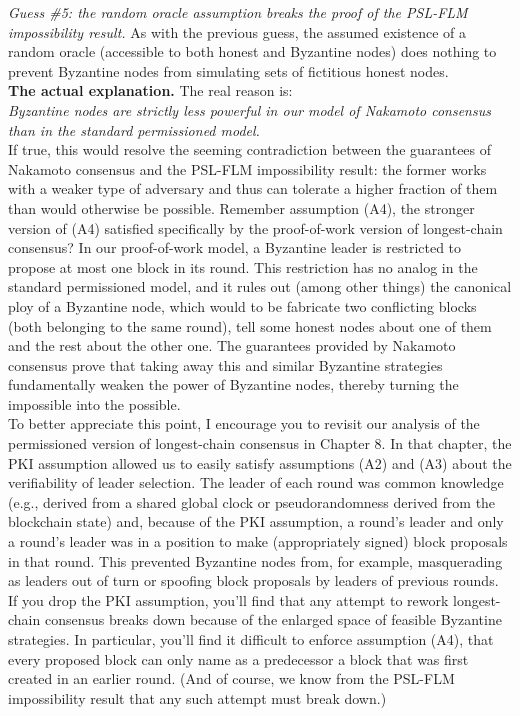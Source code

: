 \textit{Guess \#5: the random oracle assumption breaks the proof of the PSL-FLM impossibility
result.}
As with the previous guess, the assumed existence of a random oracle (accessible to both
honest and Byzantine nodes) does nothing to prevent Byzantine nodes from simulating sets
of fictitious honest nodes.\\

\noindent
\textbf{The actual explanation.} The real reason is:\\
\textit{Byzantine nodes are strictly less powerful in our model of Nakamoto consensus than in
the standard permissioned model.}\\

If true, this would resolve the seeming contradiction between the guarantees of Nakamoto
consensus and the PSL-FLM impossibility result: the former works with a weaker type of
adversary and thus can tolerate a higher fraction of them than would otherwise be possible.
Remember assumption (A4), the stronger version of (A4) satisfied specifically by the
proof-of-work version of longest-chain consensus? In our proof-of-work model, a Byzantine
leader is restricted to propose at most one block in its round. This restriction has no analog
in the standard permissioned model, and it rules out (among other things) the canonical ploy
of a Byzantine node, which would to be fabricate two conflicting blocks (both belonging to the same round), tell some honest nodes about one of them and the rest about the other one.
The guarantees provided by Nakamoto consensus prove that taking away this and similar
Byzantine strategies fundamentally weaken the power of Byzantine nodes, thereby turning
the impossible into the possible.\\

To better appreciate this point, I encourage you to revisit our analysis of the permissioned
version of longest-chain consensus in Chapter 8. In that chapter, the PKI assumption allowed
us to easily satisfy assumptions (A2) and (A3) about the verifiability of leader selection. 
The leader of each round was common knowledge (e.g., derived from a shared global clock or
pseudorandomness derived from the blockchain state) and, because of the PKI assumption, a
round’s leader and only a round’s leader was in a position to make (appropriately signed) block
proposals in that round. This prevented Byzantine nodes from, for example, masquerading
as leaders out of turn or spoofing block proposals by leaders of previous rounds. If you drop
the PKI assumption, you’ll find that any attempt to rework longest-chain consensus breaks
down because of the enlarged space of feasible Byzantine strategies. In particular, you’ll
find it difficult to enforce assumption (A4), that every proposed block can only name as a
predecessor a block that was first created in an earlier round. (And of course, we know from
the PSL-FLM impossibility result that any such attempt must break down.)\\

